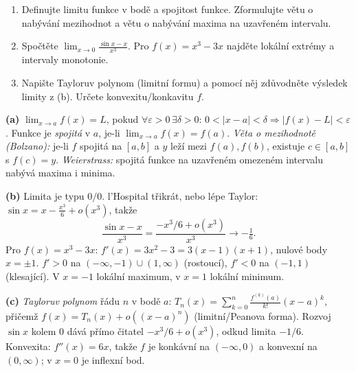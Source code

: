 \begin{zadani}
\begin{enumerate}[label=(\alph*)]
  \item {} Definujte limitu funkce v bodě a spojitost funkce. Zformulujte větu o nabývání mezihodnot a větu o nabývání maxima na uzavřeném intervalu.
  \item {} Spočtěte $\displaystyle\lim_{x\to0}\frac{\sin x - x}{x^3}$. Pro $f(x)=x^3-3x$ najděte lokální extrémy a intervaly monotonie.
  \item {} Napište Tayloruv polynom (limitní formu) a pomocí něj zdůvodněte výsledek limity z (b). Určete konvexitu/konkavitu $f$.
\end{enumerate}
\end{zadani}

\begin{reseni}
\textbf{(a)} $\lim_{x\to a}f(x)=L$, pokud $\forall\varepsilon>0\,\exists\delta>0:\,0<|x-a|<\delta\Rightarrow|f(x)-L|<\varepsilon$. Funkce je \emph{spojitá} v $a$, je-li $\lim_{x\to a}f(x)=f(a)$. \emph{Věta o mezihodnotě (Bolzano):} je-li $f$ spojitá na $[a,b]$ a $y$ leží mezi $f(a),f(b)$, existuje $c\in[a,b]$ s $f(c)=y$. \emph{Weierstrass:} spojitá funkce na uzavřeném omezeném intervalu nabývá maxima i minima.

\textbf{(b)} Limita je typu $0/0$. l'Hospital třikrát, nebo lépe Taylor: $\sin x = x-\tfrac{x^3}{6}+o(x^3)$, takže
\[
\frac{\sin x-x}{x^3}=\frac{-x^3/6+o(x^3)}{x^3}\to-\tfrac16.
\]
Pro $f(x)=x^3-3x$: $f'(x)=3x^2-3=3(x-1)(x+1)$, nulové body $x=\pm1$. $f'>0$ na $(-\infty,-1)\cup(1,\infty)$ (rostoucí), $f'<0$ na $(-1,1)$ (klesající). V $x=-1$ lokální maximum, v $x=1$ lokální minimum.

\textbf{(c)} \emph{Tayloruv polynom} řádu $n$ v bodě $a$: $T_n(x)=\sum_{k=0}^n\frac{f^{(k)}(a)}{k!}(x-a)^k$, přičemž $f(x)=T_n(x)+o((x-a)^n)$ (limitní/Peanova forma). Rozvoj $\sin x$ kolem $0$ dává přímo čitatel $-x^3/6+o(x^3)$, odkud limita $-1/6$. Konvexita: $f''(x)=6x$, takže $f$ je konkávní na $(-\infty,0)$ a konvexní na $(0,\infty)$; v $x=0$ je inflexní bod.
\end{reseni}

